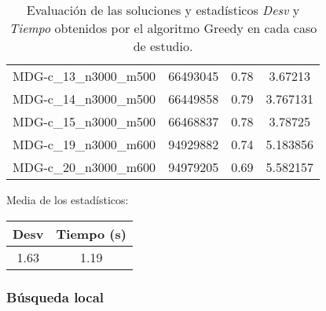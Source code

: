 \documentclass{article}
\begin{document}
\begin{table}[H]
\begin{tabular}{|cccc|}
		MDG-c\_13\_n3000\_m500 & 66493045 & 0.78 & 3.67213\\
		MDG-c\_14\_n3000\_m500 & 66449858 & 0.79 & 3.767131\\
		MDG-c\_15\_n3000\_m500 & 66468837 & 0.78 & 3.78725\\
		MDG-c\_19\_n3000\_m600 & 94929882 & 0.74 & 5.183856\\
		MDG-c\_20\_n3000\_m600 & 94979205 & 0.69 & 5.582157\\
		\hline
	\end{tabular}
	\caption{Evaluación de las soluciones y estadísticos \emph{Desv} y \emph{Tiempo} obtenidos por el algoritmo Greedy
		en cada caso de estudio.}
	\label{tab:greedy}
\end{table}

Media de los estadísticos:
\begin{table}[H]
	\centering
	\begin{tabular}{|cc|}
		\hline
		Desv & Tiempo (s)\\ \hline
		1.63 & 1.19 \\
		\hline
	\end{tabular}
\end{table}

\pagebreak

\subsubsection*{Búsqueda local}
\end{document}
